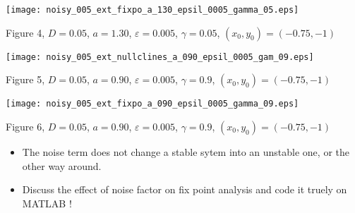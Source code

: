 \documentclass{article}
\begin{document}
\begin{center}
\texttt{[image: noisy\_005\_ext\_fixpo\_a\_130\_epsil\_0005\_gamma\_05.eps]}
\begin{footnotesize}
 Figure 4,  $D=0.05$, $a=1.30$, $\varepsilon=0.005$,          $\gamma=0.05$, $(x_0,y_0)=(-0.75,-1)$  
\end{footnotesize}
\end{center}

\begin{center}
\texttt{[image: noisy\_005\_ext\_nullclines\_a\_090\_epsil\_0005\_gam\_09.eps]}
\begin{footnotesize}
 Figure 5,  $D=0.05$, $a=0.90$, $\varepsilon=0.005$,          $\gamma=0.9$, $(x_0,y_0)=(-0.75,-1)$  
\end{footnotesize}
\end{center}

\begin{center}
\texttt{[image: noisy\_005\_ext\_fixpo\_a\_090\_epsil\_0005\_gamma\_09.eps]}
\begin{footnotesize}
 Figure 6,  $D=0.05$, $a=0.90$, $\varepsilon=0.005$,          $\gamma=0.9$, $(x_0,y_0)=(-0.75,-1)$  
\end{footnotesize}
\end{center}

\begin{itemize}
 \item The noise term does not change a stable sytem into an unstable one, or the other way around.

\item Discuss the effect of noise factor on fix point analysis and code it truely on MATLAB ! 
\end{itemize}
\end{document}
